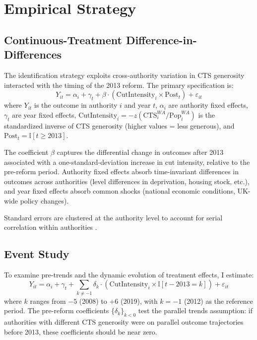 \documentclass[12pt]{article}
\newcommand{\ind}{\mathbb{I}}
\begin{document}
\section{Empirical Strategy}\label{sec:strategy}

\subsection{Continuous-Treatment Difference-in-Differences}

The identification strategy exploits cross-authority variation in CTS generosity interacted with the timing of the 2013 reform. The primary specification is:
\begin{equation}\label{eq:main}
Y_{it} = \alpha_i + \gamma_t + \beta \cdot (\text{CutIntensity}_i \times \text{Post}_t) + \varepsilon_{it}
\end{equation}
where $Y_{it}$ is the outcome in authority $i$ and year $t$, $\alpha_i$ are authority fixed effects, $\gamma_t$ are year fixed effects, $\text{CutIntensity}_i = -z(\text{CTS}_{i}^{WA}/\text{Pop}_{i}^{WA})$ is the standardized inverse of CTS generosity (higher values = less generous), and $\text{Post}_t = \ind[t \geq 2013]$.

The coefficient $\beta$ captures the differential change in outcomes after 2013 associated with a one-standard-deviation increase in cut intensity, relative to the pre-reform period. Authority fixed effects absorb time-invariant differences in outcomes across authorities (level differences in deprivation, housing stock, etc.), and year fixed effects absorb common shocks (national economic conditions, UK-wide policy changes).

Standard errors are clustered at the authority level to account for serial correlation within authorities \citep{bertrand2004}.

\subsection{Event Study}

To examine pre-trends and the dynamic evolution of treatment effects, I estimate:
\begin{equation}\label{eq:es}
Y_{it} = \alpha_i + \gamma_t + \sum_{k \neq -1} \delta_k \cdot (\text{CutIntensity}_i \times \ind[t - 2013 = k]) + \varepsilon_{it}
\end{equation}
where $k$ ranges from $-5$ (2008) to $+6$ (2019), with $k = -1$ (2012) as the reference period. The pre-reform coefficients $\{\delta_k\}_{k < 0}$ test the parallel trends assumption: if authorities with different CTS generosity were on parallel outcome trajectories before 2013, these coefficients should be near zero.
\end{document}
